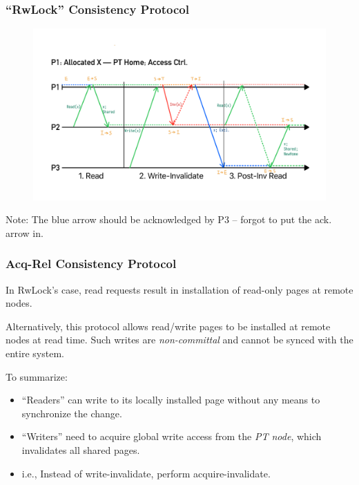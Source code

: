 \documentclass{beamer}
\begin{document}
\begin{frame}
    \frametitle{``RwLock'' Consistency Protocol}
    \begin{figure}
        \centering
        \includegraphics[width=\linewidth]{
            w12_slides_resources/Fig-RwLockProtocol 2023-12-04 21_03_50.pdf
        }
    \end{figure}
    Note: The blue arrow should be acknowledged by P3 -- forgot to put the ack. arrow in.
\end{frame}

\begin{frame}
    \frametitle{Acq-Rel Consistency Protocol}
    In RwLock's case, read requests result in installation of read-only pages at
    remote nodes.

    Alternatively, this protocol allows read/write pages to be installed at remote
    nodes at read time. Such writes are \emph{non-committal} and cannot be synced
    with the entire system.

    To summarize:
    \begin{itemize}
        \item {
            ``Readers'' can write to its locally installed page without any means
            to synchronize the change.
        }
        \item {
            ``Writers'' need to acquire global write access from the \emph{PT node},
            which invalidates all shared pages.
        }
        \item {
            i.e., Instead of write-invalidate, perform acquire-invalidate.
        }
    \end{itemize}
\end{frame}
\end{document}
